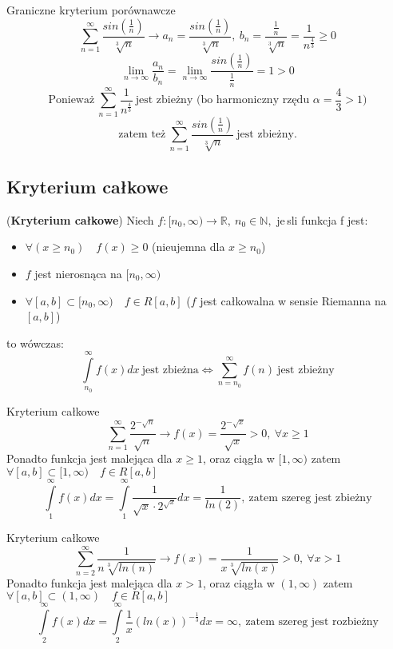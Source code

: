 \begin{przyk}{Graniczne kryterium porównawcze}
$$\sum_{n=1}^{\infty} \frac{sin(\frac{1}{n})}{\sqrt[3]{n}} \rightarrow a_n=\frac{sin(\frac{1}{n})}{\sqrt[3]{n}}, \ b_n=\frac{\frac{1}{n}}{\sqrt[3]{n}}=\frac{1}{n^{\frac{4}{3}}}\geq 0$$
$$\lim_{n \to \infty} \frac{a_n}{b_n}=\lim_{n \to \infty} \frac{sin(\frac{1}{n})}{\frac{1}{n}}=1>0$$
$$\text{Ponieważ}\ \sum_{n=1}^{\infty} \frac{1}{n^{\frac{4}{3}}}\ \text{jest zbieżny (bo harmoniczny rzędu $\alpha=\frac{4}{3}> 1$)}$$
$$\text{zatem też}\ \sum_{n=1}^{\infty} \frac{sin(\frac{1}{n})}{\sqrt[3]{n}}\ \text{jest zbieżny.}$$
\end{przyk}

\subsection{Kryterium całkowe}

\begin{df}{(\textbf{Kryterium całkowe})}
Niech $f: [n_0,\infty)\rightarrow\mathbb{R},\ n_0\in \mathbb{N},$ je{\,s}li funkcja f jest:
\begin{itemize}
\item
$\forall (x\geq n_0)\quad f(x)\geq 0$ (nieujemna dla $x\geq n_0$)
\item
$f$ jest nierosnąca na $[n_0,\infty)$
\item
$\forall [a,b]\subset[n_0,\infty)\quad f\in R[a,b]$ ($f$ jest całkowalna w sensie Riemanna na $[a,b]$)
\end{itemize}
to wówczas:
$$\int\limits_{n_0}^{\infty} f(x)dx\ \text{jest zbieżna} \Leftrightarrow \sum_{n=n_0}^{\infty}f(n)\ \text{jest zbieżny}$$
\end{df}

\begin{przyk}{Kryterium całkowe}
$$\sum_{n=1}^{\infty} \frac{2^{-\sqrt{n}}}{\sqrt{n}} \rightarrow f(x)=\frac{2^{-\sqrt{x}}}{\sqrt{x}}>0,\ \forall x\geq1$$
Ponadto funkcja jest malejąca dla $x\geq 1$, oraz ciągła w $[1,\infty)$ zatem $\forall[a,b]\subset [1,\infty)\quad f\in R[a,b]$
$$\int\limits_{1}^{\infty} f(x)dx=\int\limits_{1}^{\infty} \frac{1}{\sqrt{x}\cdot 2^{\sqrt{x}}}dx=\frac{1}{ln(2)},\ \text{zatem szereg jest zbieżny}$$
\end{przyk}

\begin{przyk}{Kryterium całkowe}
$$\sum_{n=2}^{\infty} \frac{1}{n\sqrt[3]{ln(n)}} \rightarrow f(x)=\frac{1}{x\sqrt[3]{ln(x)}}>0,\ \forall x>1$$
Ponadto funkcja jest malejąca dla $x>1$, oraz ciągła w $(1,\infty)$ zatem $\forall[a,b]\subset (1,\infty)\quad f\in R[a,b]$
$$\int\limits_{2}^{\infty} f(x)dx=\int\limits_{2}^{\infty} \frac{1}{x} (ln(x))^{- \frac{1}{3}}dx=\infty,\ \text{zatem szereg jest rozbieżny}$$
\end{przyk}

